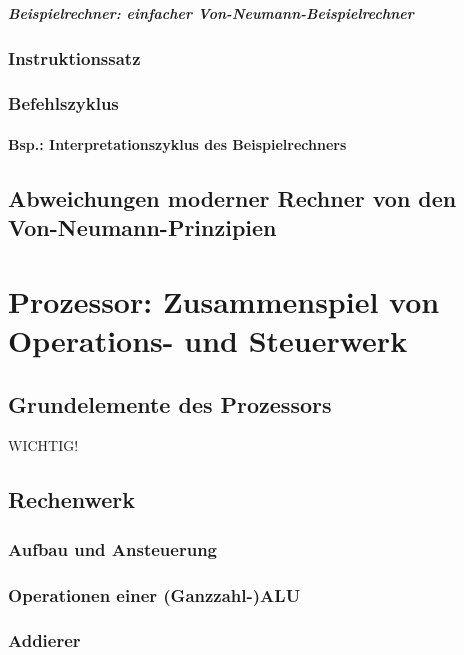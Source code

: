 \paragraph{Beispielrechner: einfacher Von-Neumann-Beispielrechner}

\subsection{Instruktionssatz}

\subsection{Befehlszyklus}

\subsubsection*{Bsp.: Interpretationszyklus des Beispielrechners}

\section{Abweichungen moderner Rechner von den Von-Neumann-Prinzipien}

\chapter{Prozessor: Zusammenspiel von Operations- und Steuerwerk}
\section*{Grundelemente des Prozessors} WICHTIG!
\section{Rechenwerk}
\subsection*{Aufbau und Ansteuerung}
\subsection*{Operationen einer (Ganzzahl-)ALU}

\subsection{Addierer}
